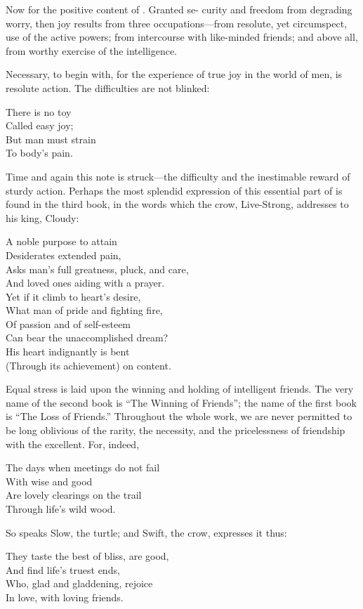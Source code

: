 Now for the positive content of . Granted se- curity and
freedom from degrading worry, then joy results from three
occupations---from resolute, yet circumspect, use of the active
powers; from intercourse with like-minded friends; and above all, from
worthy exercise of the intelligence.

Necessary, to begin with, for the experience of true joy in the world
of men, is resolute action. The difficulties are not blinked:
\begin{pverse}
There is no toy\\
Called easy joy;\\
But man must strain\\
To body's pain.
\end{pverse}
Time and again this note is struck---the difficulty and
the inestimable reward of sturdy action. Perhaps the
most splendid expression of this essential part of 
is found in the third book, in the words which the
crow, Live-Strong, addresses to his king, Cloudy:
\begin{pverse}
A noble purpose to attain\\
Desiderates extended pain,\\
Asks man's full greatness, pluck, and care,\\
And loved ones aiding with a prayer.\\
Yet if it climb to heart's desire,\\
What man of pride and fighting fire,\\
Of passion and of self-esteem\\
Can bear the unaccomplished dream?\\
His heart indignantly is bent\\
(Through its achievement) on content.\\
\end{pverse}

Equal stress is laid upon the winning and holding of intelligent
friends. The very name of the second book is ``The Winning of Friends'';
the name of the first book is ``The Loss of Friends.'' Throughout the
whole work, we are never permitted to be long oblivious of the rarity,
the necessity, and the pricelessness of friendship with the
excellent. For, indeed,
\begin{pverse}
The days when meetings do not fail\\
With wise and good\\
Are lovely clearings on the trail\\
Through life's wild wood.
\end{pverse}
So speaks Slow, the turtle; and Swift, the crow, expresses it thus:
\begin{pverse}
They taste the best of bliss, are good,\\
And find life's truest ends,\\
Who, glad and gladdening, rejoice\\
In love, with loving friends.
\end{pverse}

